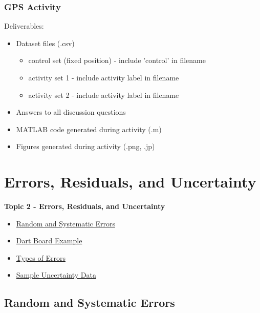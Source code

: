 \documentclass[fleqn]{beamer} %
\newcommand{\sectionIItitle}{Errors, Residuals, and Uncertainty}
\newcommand{\sectionIsubsectionIVtitle}{GPS Activity}
\newcommand{\sectionIIsubsectionItitle}{Random and Systematic Errors}
\newcommand{\sectionIIsubsectionIItitle}{Dart Board Example}
\newcommand{\sectionIIsubsectionIIItitle}{Types of Errors}
\newcommand{\sectionIIsubsectionIVtitle}{Sample Uncertainty Data}
\begin{document}
			\begin{frame}
				\frametitle{\sectionIsubsectionIVtitle}
				Deliverables:
				\begin{itemize}
					\item Dataset files (.csv)
					\begin{itemize}
						\item control set (fixed position) - include 'control' in filename
						\item activity set 1 - include activity label in filename
						\item activity set 2 - include activity label in filename
					\end{itemize}
					\item Answers to all discussion questions
					\item MATLAB code generated during activity (.m)
					\item Figures generated during activity (.png, .jp)
				\end{itemize}
				


			\end{frame}

	\section{\sectionIItitle}\label{sectionII}

		\begin{frame}
			\large \textbf{Topic 2 - \sectionIItitle} \vspace{3mm}\\

			\begin{itemize}
				\item \hyperlink{sectionIIsubsectionI}{\sectionIIsubsectionItitle} \vspc %
				\item \hyperlink{sectionIIsubsectionII}{\sectionIIsubsectionIItitle} \vspc %
				\item \hyperlink{sectionIIsubsectionIII}{\sectionIIsubsectionIIItitle} \vspc %
				\item \hyperlink{sectionIIsubsectionIV}{\sectionIIsubsectionIVtitle} \vspc %
			\end{itemize}

		\end{frame}

		\subsection{\sectionIIsubsectionItitle}\label{sectionIIsubsectionI}
\end{document}
